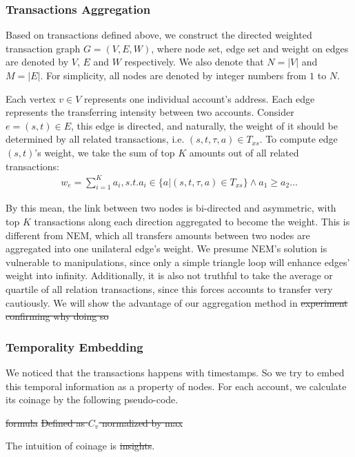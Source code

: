 \subsubsection{Transactions Aggregation} \label{subsec:aggreate}
 Based on transactions defined above, we construct the directed weighted transaction graph $G=(V, E, W)$, where node set, edge set and weight on edges are denoted by $V$, $E$ and $W$ respectively. We also denote that $N = |V|$ and $M = |E|$. For simplicity, all nodes are denoted by integer numbers from $1$ to $N$.

Each vertex $v \in V$ represents one individual account's address. Each edge represents the transferring intensity between two accounts. Consider $e=(s,t) \in E$, this edge is directed, and naturally, the weight of it should be determined by all related transactions, i.e. $(s,t,\tau, a) \in T_{xs}$. To compute edge $(s,t)$'s weight, we take the sum of top $K$ amounts out of all related transactions:
\begin{align}\label{formula:edgeweight}
w_e = \sum_{i=1}^K a_i, s.t. a_i \in \{a|(s,t,\tau,a) \in T_{xs} \} \land a_1 \geq a_2 \dots
\end{align}

By this mean, the link between two nodes is bi-directed and asymmetric, with top $K$ transactions along each direction aggregated to become the weight. This is different from NEM, which all transfers amounts between two nodes are aggregated into one unilateral edge's weight\cite{nem}. We presume NEM's solution is vulnerable to manipulations, since only a simple triangle loop will enhance edges' weight into infinity. Additionally, it is also not truthful to take the average or quartile of all relation transactions, since this forces accounts to transfer very cautiously. We will show the advantage of our aggregation method in  \st{experiment confirming why doing so}

\subsubsection{Temporality Embedding} \label{subsec:coinage}
We noticed that the transactions happens with timestamps. So we try to embed this temporal information as a property of nodes. For each account, we calculate its coinage by the following pseudo-code.

\st{formula} \st{Defined as $C_v$ normalized by max}

The intuition of coinage is \st{insights}.

